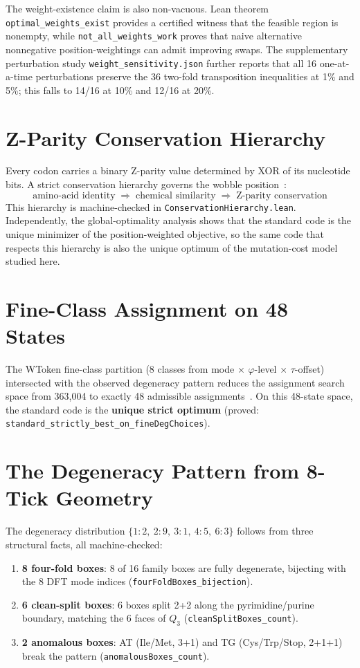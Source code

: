 \documentclass[11pt,twocolumn]{article}
\begin{document}
The weight-existence claim is also non-vacuous. Lean theorem
\texttt{optimal\_weights\_exist} provides a certified witness that the
feasible region is nonempty, while \texttt{not\_all\_weights\_work} proves
that naive alternative nonnegative position-weightings can admit improving
swaps. The supplementary perturbation study
\texttt{weight\_sensitivity.json} further reports that all 16 one-at-a-time
perturbations preserve the 36 two-fold transposition inequalities at
1\% and 5\%; this falls to 14/16 at 10\% and 12/16 at 20\%.

\section{Z-Parity Conservation Hierarchy}

Every codon carries a binary Z-parity value determined by XOR of its
nucleotide bits. A strict conservation hierarchy governs the wobble
position~\cite{Paper3}:
\[
\text{amino-acid identity} \;\Rightarrow\; \text{chemical similarity}
\;\Rightarrow\; \text{Z-parity conservation}
\]
This hierarchy is machine-checked in \texttt{ConservationHierarchy.lean}.
Independently, the global-optimality analysis shows that the standard code
is the unique minimizer of the position-weighted objective, so the same code
that respects this hierarchy is also the unique optimum of the mutation-cost
model studied here.

\section{Fine-Class Assignment on 48 States}

The WToken fine-class partition (8 classes from mode $\times$ $\varphi$-level
$\times$ $\tau$-offset) intersected with the observed degeneracy pattern
reduces the assignment search space from 363,004 to exactly 48 admissible
assignments~\cite{Paper5}. On this 48-state space, the standard code is
the \textbf{unique strict optimum} (proved:
\texttt{standard\_strictly\_best\_on\_fineDegChoices}).

\section{The Degeneracy Pattern from 8-Tick Geometry}

The degeneracy distribution $\{1{:}2,\ 2{:}9,\ 3{:}1,\ 4{:}5,\ 6{:}3\}$
follows from three structural facts, all machine-checked:

\begin{enumerate}
\item \textbf{8 four-fold boxes}: 8 of 16 family boxes are fully
  degenerate, bijecting with the 8 DFT mode indices
  (\texttt{fourFoldBoxes\_bijection}).
\item \textbf{6 clean-split boxes}: 6 boxes split 2+2 along the
  pyrimidine/purine boundary, matching the 6 faces of $Q_3$
  (\texttt{cleanSplitBoxes\_count}).
\item \textbf{2 anomalous boxes}: AT (Ile/Met, 3+1) and TG
  (Cys/Trp/Stop, 2+1+1) break the pattern
  (\texttt{anomalousBoxes\_count}).
\end{enumerate}
\end{document}
